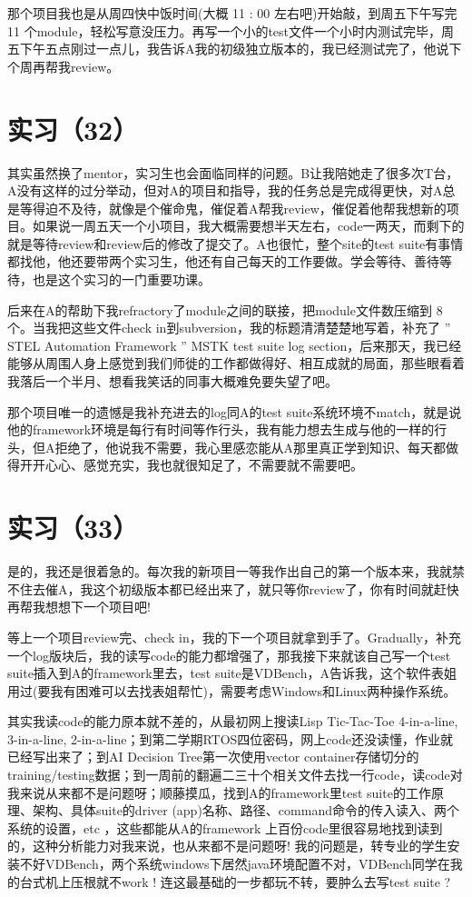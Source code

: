 \documentclass[12pt]{book}
\begin{document}
那个项目我也是从周四快中饭时间(大概 11 : 00 左右吧)开始敲，到周五下午写完 11 个module，轻松写意没压力。再写一个小的test文件一个小时内测试完毕，周五下午五点刚过一点儿，我告诉A我的初级独立版本的，我已经测试完了，他说下个周再帮我review。

\section{实习（32）}
\label{sec-5-35}

其实虽然换了mentor，实习生也会面临同样的问题。B让我陪她走了很多次T台，A没有这样的过分举动，但对A的项目和指导，我的任务总是完成得更快，对A总是等得迫不及待，就像是个催命鬼，催促着A帮我review，催促着他帮我想新的项目。如果说一周五天一个小项目，我大概需要想半天左右，code一两天，而剩下的就是等待review和review后的修改了提交了。A也很忙，整个site的test suite有事情都找他，他还要带两个实习生，他还有自己每天的工作要做。学会等待、善待等待，也是这个实习的一门重要功课。

后来在A的帮助下我refractory了module之间的联接，把module文件数压缩到 8 个。当我把这些文件check in到subversion，我的标题清清楚楚地写着，补充了 ” STEL Automation Framework ” MSTK test suite log section，后来那天，我已经能够从周围人身上感觉到我们师徙的工作都做得好、相互成就的局面，那些眼看着我落后一个半月、想看我笑话的同事大概难免要失望了吧。

那个项目唯一的遗憾是我补充进去的log同A的test suite系统环境不match，就是说他的framework环境是每行有时间等作行头，我有能力想去生成与他的一样的行头，但A拒绝了，他说我不需要，我心里感恋能从A那里真正学到知识、每天都做得开开心心、感觉充实，我也就很知足了，不需要就不需要吧。


\section{实习（33）}
\label{sec-5-36}

是的，我还是很着急的。每次我的新项目一等我作出自己的第一个版本来，我就禁不住去催A，我这个初级版本都已经出来了，就只等你review了，你有时间就赶快再帮我想想下一个项目吧! 

等上一个项目review完、check in，我的下一个项目就拿到手了。Gradually，补充一个log版块后，我的读写code的能力都增强了，那我接下来就该自己写一个test suite插入到A的framework里去，test suite是VDBench，A告诉我，这个软件表姐用过(要我有困难可以去找表姐帮忙)，需要考虑Windows和Linux两种操作系统。

其实我读code的能力原本就不差的，从最初网上搜读Lisp Tic-Tac-Toe 4-in-a-line, 3-in-a-line, 2-in-a-line；到第二学期RTOS四位密码，网上code还没读懂，作业就已经写出来了；到AI Decision Tree第一次使用vector container存储切分的training/testing数据；到一周前的翻遍二三十个相关文件去找一行code，读code对我来说从来都不是问题呀；顺藤摸瓜，找到A的framework里test suite的工作原理、架构、具体suite的driver (app)名称、路径、command命令的传入读入、两个系统的设置，etc ，这些都能从A的framework 上百份code里很容易地找到读到的，这种分析能力对我来说，也从来都不是问题呀! 我的问题是，转专业的学生安装不好VDBench，两个系统windows下居然java环境配置不对，VDBench同学在我的台式机上压根就不work ! 连这最基础的一步都玩不转，要肿么去写test suite ?
\end{document}
